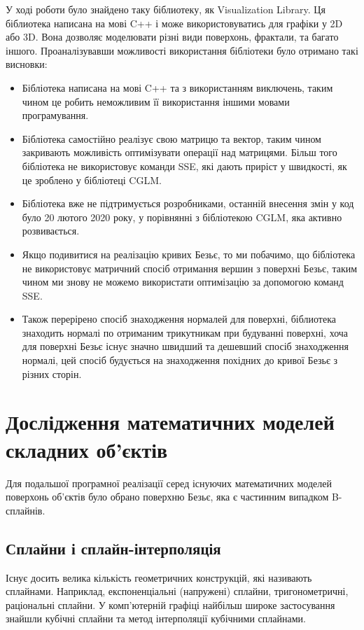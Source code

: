\let\mypdfximage\pdfximage\def\pdfximage{\immediate\mypdfximage}\documentclass[14pt,a4paper]{extarticle}
\theoremstyle{definition}
\renewcommand{\[}{\begin{singlespace}\begin{equation*}}
\renewcommand{\]}{\end{equation*}\end{singlespace}}
\renewcommand{\+}{\discretionary{\mbox{\scriptsize$\hookleftarrow$}}{}{}}
\begin{document}
У ході роботи було знайдено таку біблиотеку, як Visualization Library. Ця біблиотека написана на мові C++ і може використовуватись для графіки у 2D або 3D. Вона дозволяє моделювати різні види поверхонь, фрактали, та багато іншого. Проаналізувавши можливості використання бібліотеки було отримано такі висновки:

\begin{itemize}
\item Бібліотека написана на мові C++ та з використанням виключень, таким чином це робить неможливим її використання іншими мовами програмування.
\item Бібліотека самостійно реалізує свою матрицю та вектор, таким чином закривають можливість оптимізувати операції над матрицями. Більш того бібліотека не  використовує команди SSE, які дають приріст у швидкості, як це зроблено у бібліотеці CGLM.
\item Бібліотека вже не підтримується розробниками, останній внесення змін у код було 20 лютого 2020 року, у порівнянні з бібліотекою CGLM, яка активно розвивається.
\item Якщо подивитися на реалізацію кривих Безьє, то ми побачимо, що бібліотека не використовує матричний спосіб отримання вершин з поверхні Безьє, таким чином ми знову не можемо використати оптимізацію за допомогою команд SSE.
\item Також перерірено спосіб знаходження нормалей для поверхні, біблиотека знаходить нормалі по отриманим трикутникам при будуванні поверхні, хоча для поверхні Безьє існує значно швидший та дешевший спосіб знаходження нормалі, цей спосіб будується на знаходження похідних до кривої Безьє з різних сторін.
\end{itemize}

\section{Дослідження математичних моделей складних об'єктів}

Для подальшої програмної реалізації серед існуючих математичних моделей поверхонь об'єктів було обрано поверхню Безьє, яка є частинним випадком B-сплайнів.

\subsection{Сплайни і сплайн-інтерполяція}

Існує досить велика кількість геометричних конструкцій, які називають сплайнами. Наприклад, експоненціальні (напружені) сплайни, тригонометричні, раціональні сплайни. У комп'ютерній графіці найбільш широке застосування знайшли кубічні сплайни та метод інтерполяції кубічними сплайнами.
\end{document}
